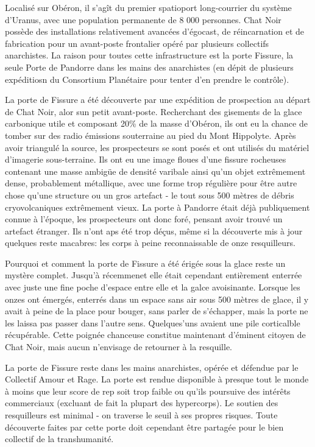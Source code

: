 Localisé sur Obéron, il s'agît du premier spatioport long-courrier du système d'Uranus, avec une population permanente de 8 000 personnes. Chat Noir possède des installations relativement avancées d'égocast, de réincarnation et de fabrication pour un avant-poste frontalier opéré par plusieurs collectifs anarchistes. La raison pour toutes cette infrastructure est la porte Fissure, la seule Porte de Pandorre dans les mains des anarchistes (en dépit de plusieurs expéditiosn du Consortium Planétaire pour tenter d'en prendre le contrôle). 

La porte de Fissure a été découverte par une expédition de prospection au départ de Chat Noir, alor sun petit avant-poste. Recherchant des gisements de la glace carbonique utile et composant 20\% de la masse d'Obéron, ils ont eu la chance de tomber sur des radio émissions souterraine au pied du Mont Hippolyte. Après avoir triangulé la source, les prospecteurs se sont posés et ont utilisés du matériel d'imagerie sous-terraine. Ils ont eu une image floues d'une fissure rocheuses contenant une masse ambigüe de densité varibale ainsi qu'un objet extrêmement dense, probablement métallique, avec une forme trop régulière pour être autre chose qu'une structure ou un gros artefact - le tout sous 500 mètres de débris cryovolcaniques extrêmement vieux. La porte à Pandorre était déjà publiquement connue à l'époque, les prospecteurs ont donc foré, pensant avoir trouvé un artefact étranger. Ils n'ont aps été trop déçus, même si la découverte mis à jour quelques reste macabres: les corps à peine reconnaissable de onze resquilleurs. 

Pourquoi et comment la porte de Fissure a été érigée sous la glace reste un mystère complet. Jusqu'à récemmenet elle était cependant entièrement enterrée avec juste une fine poche d'espace entre elle et la galce avoisinante. Lorsque les onzes ont émergés, enterrés dans un espace sans air sous 500 mètres de glace, il y avait à peine de la place pour bouger, sans parler de s'échapper, mais la porte ne les laissa pas passer dans l'autre sens. Quelques'uns avaient une pile corticalble récupérable. Cette poignée chanceuse constitue maintenant d'éminent citoyen de Chat Noir, mais aucun n'envisage de retourner à la resquille. 

La porte de Fissure reste dans les mains anarchistes, opérée et défendue par le Collectif Amour et Rage. La porte est rendue disponible à presque tout le monde à moins que leur score de rep soit trop faible ou qu'ils poursuive des intérêts commerciaux (excluant de fait la plupart des hypercorps). Le soutien des resquilleurs est minimal - on traverse le seuil à ses propres risques. Toute découverte faites par cette porte doit cependant être partagée pour le bien collectif de la transhumanité. 

